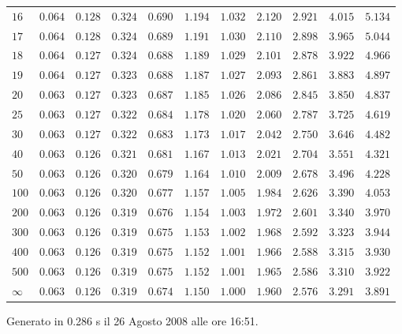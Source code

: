\begin{table}[htb!]
\begin{center}
{\begin{tabular}{p{22 pt}cccccccccc}
$16$ & $0.064$ & $0.128$ & $0.324$ & $0.690$ & $1.194$ & $1.032$ & $2.120$ & $2.921$ & $4.015$ & $5.134$\\
$17$ & $0.064$ & $0.128$ & $0.324$ & $0.689$ & $1.191$ & $1.030$ & $2.110$ & $2.898$ & $3.965$ & $5.044$\\
$18$ & $0.064$ & $0.127$ & $0.324$ & $0.688$ & $1.189$ & $1.029$ & $2.101$ & $2.878$ & $3.922$ & $4.966$\\
$19$ & $0.064$ & $0.127$ & $0.323$ & $0.688$ & $1.187$ & $1.027$ & $2.093$ & $2.861$ & $3.883$ & $4.897$\\
$20$ & $0.063$ & $0.127$ & $0.323$ & $0.687$ & $1.185$ & $1.026$ & $2.086$ & $2.845$ & $3.850$ & $4.837$\\
$25$ & $0.063$ & $0.127$ & $0.322$ & $0.684$ & $1.178$ & $1.020$ & $2.060$ & $2.787$ & $3.725$ & $4.619$\\
$30$ & $0.063$ & $0.127$ & $0.322$ & $0.683$ & $1.173$ & $1.017$ & $2.042$ & $2.750$ & $3.646$ & $4.482$\\
$40$ & $0.063$ & $0.126$ & $0.321$ & $0.681$ & $1.167$ & $1.013$ & $2.021$ & $2.704$ & $3.551$ & $4.321$\\
$50$ & $0.063$ & $0.126$ & $0.320$ & $0.679$ & $1.164$ & $1.010$ & $2.009$ & $2.678$ & $3.496$ & $4.228$\\
$100$ & $0.063$ & $0.126$ & $0.320$ & $0.677$ & $1.157$ & $1.005$ & $1.984$ & $2.626$ & $3.390$ & $4.053$\\
$200$ & $0.063$ & $0.126$ & $0.319$ & $0.676$ & $1.154$ & $1.003$ & $1.972$ & $2.601$ & $3.340$ & $3.970$\\
$300$ & $0.063$ & $0.126$ & $0.319$ & $0.675$ & $1.153$ & $1.002$ & $1.968$ & $2.592$ & $3.323$ & $3.944$\\
$400$ & $0.063$ & $0.126$ & $0.319$ & $0.675$ & $1.152$ & $1.001$ & $1.966$ & $2.588$ & $3.315$ & $3.930$\\
$500$ & $0.063$ & $0.126$ & $0.319$ & $0.675$ & $1.152$ & $1.001$ & $1.965$ & $2.586$ & $3.310$ & $3.922$\\
$\infty$ & $0.063$ & $0.126$ & $0.319$ & $0.674$ & $1.150$ & $1.000$ & $1.960$ & $2.576$ & $3.291$ & $3.891$\\
\hline

\end{tabular}
}
\end{center}
\end{table}
\vfill
\hfill {\scriptsize Generato in 0.286 s il 26 Agosto 2008 alle ore 16:51.}
